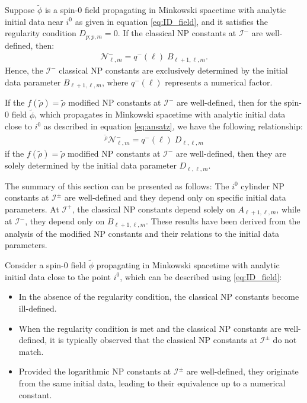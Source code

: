 \begin{proposition}
  Suppose $\tilde{\phi}$ is a spin-0 field propagating in Minkowski spacetime with analytic initial data near $i^0$ as given in equation \eqref{eq:ID_field}, and it satisfies the regularity condition $D_{p;p,m}=0$. If the classical NP constants at $\mathscr{I}^-$ are well-defined, then:
  \begin{align}
    \mathcal{N}^{-}_{\ell,m}=q^{-}(\ell) \;B_{\ell+1,\ell,m}.
  \end{align}
  Hence, the $\mathscr{I}^-$ classical NP constants are exclusively determined by the initial data parameter $B_{\ell+1,\ell,m}$, where $q^{-}(\ell)$ represents a numerical factor.
\end{proposition}

\begin{proposition}
  If the $f(\tilde{\rho})=\tilde{\rho}$ modified NP constants at $\mathscr{I}^-$ are well-defined, then for the spin-0 field $\tilde{\phi}$, which propagates in Minkowski spacetime with analytic initial data close to $i^0$ as described in equation \ref{eq:ansatz}, we have the following relationship:
  \begin{align}
     {}^{\tilde{\rho}}\mathcal{N}^{-}_{\ell,m}=q^{-}(\ell) \;D_{\ell,\ell,m}
   \end{align}
   if the $f(\tilde{\rho})=\tilde{\rho}$ modified NP constants at $\mathscr{I}^-$ are well-defined, then they are solely determined by the initial data parameter $D_{\ell,\ell,m}$.
\end{proposition}

The summary of this section can be presented as follows: The $i^0$ cylinder NP constants at $\mathscr{I}^{\pm}$ are well-defined and they depend only on specific initial data parameters. At $\mathscr{I}^{+}$, the classical NP constants depend solely on $A_{\ell+1, \ell, m}$, while at $\mathscr{I}^{-}$, they depend only on $B_{\ell+1, \ell, m}$. These results have been derived from the analysis of the modified NP constants and their relations to the initial data parameters.

\begin{corollary}
  Consider a spin-0 field $\tilde{\phi}$ propagating in Minkowski spacetime with analytic initial data close to the point $i^0$, which can be described using \eqref{eq:ID_field}:

  \begin{itemize}
  \item  In the absence of the regularity condition, the classical NP constants become ill-defined.
  \item  When the regularity condition is met and the classical NP constants are well-defined, it is typically observed that the classical NP constants at $\mathscr{I}^{\pm}$ do not match. 
  \item Provided the logarithmic NP constants at $\mathscr{I}^{\pm}$ are well-defined, they originate from the same initial data, leading to their equivalence up to a numerical constant.
  \end{itemize}
\end{corollary}

